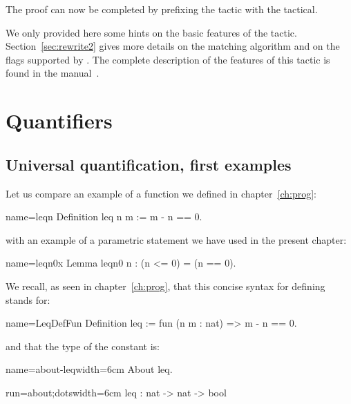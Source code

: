The proof can now be completed by prefixing the tactic with the
 tactical.

We only provided here some hints on the basic features of the 
tactic. Section~\ref{sec:rewrite2} gives more details on the matching
algorithm and on the flags supported by . The complete
description of the features of this tactic is found
in the manual~\cite{ssrman}.


\section{Quantifiers}

\subsection{Universal quantification, first examples}

Let us compare an example of a function we defined in
chapter~\ref{ch:prog}:

\begin{coq}{name=leqn}{}
Definition leq n m := m - n == 0.
\end{coq}
with an example of a parametric statement we have used in the present
chapter:

\begin{coq}{name=leqn0x}{}
Lemma leqn0 n : (n <= 0) = (n == 0).
\end{coq}

We recall, as seen in chapter~\ref{ch:prog}, that this concise syntax
for defining  stands for:

\begin{coq}{name=LeqDefFun}{}
Definition leq := fun (n m : nat) => m - n == 0.
\end{coq}

and that the type of the constant  is:

\begin{coq-left}{name=about-leq}{width=6cm}
About leq.
\end{coq-left}
\begin{coqout-right}{run=about;dots}{width=6cm}
leq : nat -> nat -> bool
\end{coqout-right}

